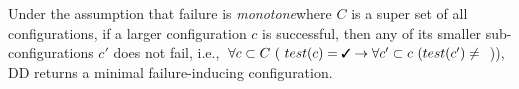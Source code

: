 Under the assumption that failure is {\em monotone}\textemdash where $C$ is a super set of all configurations, if a larger configuration $c$ is successful, then any of its smaller sub-configurations $c'$ does not fail, i.e., $\forall c \subset C\ (\ test(c)=\text{\cmark} \rightarrow \forall c' \subset c \  (test(c') \neq$ )), DD returns a minimal failure-inducing configuration. %

